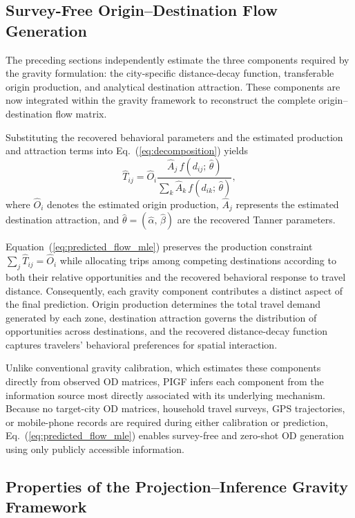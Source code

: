 \subsection{Survey-Free Origin--Destination Flow Generation}\label{sec:algorithmic_flow}

The preceding sections independently estimate the three components required by the gravity formulation: the city-specific distance-decay function, transferable origin production, and analytical destination attraction. These components are now integrated within the gravity framework to reconstruct the complete origin--destination flow matrix.

Substituting the recovered behavioral parameters and the estimated production and attraction terms into Eq.~(\ref{eq:decomposition}) yields
\begin{equation}\label{eq:predicted_flow_mle}
\hat{T}_{ij} = \hat{O}_i \frac{\hat{A}_j\, f(d_{ij};\,\hat{\theta})}{\sum_{k} \hat{A}_k\, f(d_{ik};\,\hat{\theta})},
\end{equation}
where $\hat{O}_i$ denotes the estimated origin production, $\hat{A}_j$ represents the estimated destination attraction, and $\hat{\theta} = (\hat{\alpha},\, \hat{\beta})$ are the recovered Tanner parameters.

Equation~(\ref{eq:predicted_flow_mle}) preserves the production constraint $\sum_{j} \hat{T}_{ij} = \hat{O}_i$ while allocating trips among competing destinations according to both their relative opportunities and the recovered behavioral response to travel distance. Consequently, each gravity component contributes a distinct aspect of the final prediction. Origin production determines the total travel demand generated by each zone, destination attraction governs the distribution of opportunities across destinations, and the recovered distance-decay function captures travelers' behavioral preferences for spatial interaction.

Unlike conventional gravity calibration, which estimates these components directly from observed OD matrices, PIGF infers each component from the information source most directly associated with its underlying mechanism. Because no target-city OD matrices, household travel surveys, GPS trajectories, or mobile-phone records are required during either calibration or prediction, Eq.~(\ref{eq:predicted_flow_mle}) enables survey-free and zero-shot OD generation using only publicly accessible information.

\subsection{Properties of the Projection--Inference Gravity Framework}

